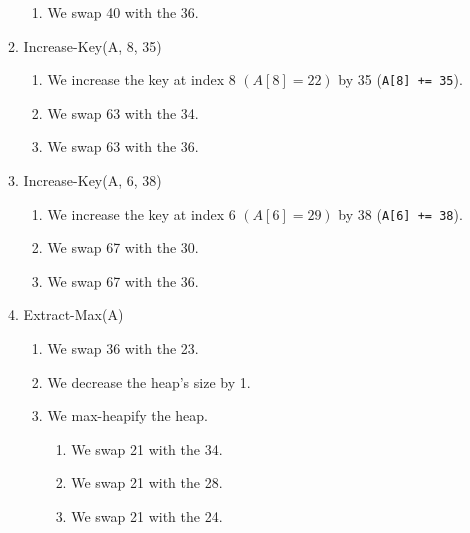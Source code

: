 \documentclass{article}
\begin{document}
\begin{enumerate}[label=\arabic*)]
\begin{multicols}{2}
\begin{enumerate}[label=\alph*.]
\begin{enumerate}[label=\arabic*.]
                                    \item We swap 40 with the 36.
                              \end{enumerate}
                        \item Increase-Key(A, 8, 35)
                              \begin{enumerate}[label=\arabic*.]
                                    \item We increase the key at index 8 \((A[8] = 22)\) by 35 (\lstinline|A[8] += 35|).
                                    \item We swap 63 with the 34.
                                    \item We swap 63 with the 36.
                              \end{enumerate}
                        \item Increase-Key(A, 6, 38)
                              \begin{enumerate}[label=\arabic*.]
                                    \item We increase the key at index 6 \((A[6] = 29)\) by 38 (\lstinline|A[6] += 38|).
                                    \item We swap 67 with the 30.
                                    \item We swap 67 with the 36.
                              \end{enumerate}
                        \item Extract-Max(A)
                              \begin{enumerate}[label=\arabic*.]
                                    \item We swap 36 with the 23.
                                    \item We decrease the heap's size by 1.
                                    \item We max-heapify the heap.
                                          \begin{enumerate}[label=3.\arabic*.]
                                                \item We swap 21 with the 34.
                                                \item We swap 21 with the 28.
                                                \item We swap 21 with the 24.
                                          \end{enumerate}
                              \end{enumerate}

\end{enumerate}
\end{multicols}
\end{enumerate}
\end{document}
